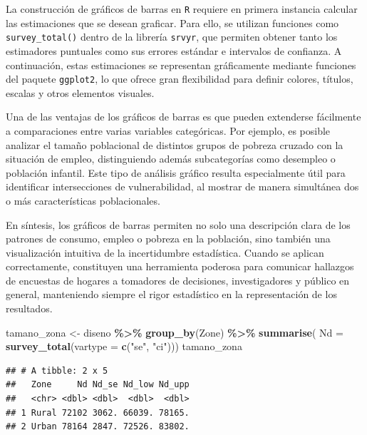 \documentclass[
  spanish,
  12pt,
]{book}
\newenvironment{Shaded}{\begin{snugshade}}{\end{snugshade}}
\newcommand{\AttributeTok}[1]{\textcolor[rgb]{0.13,0.29,0.53}{#1}}
\newcommand{\FunctionTok}[1]{\textcolor[rgb]{0.13,0.29,0.53}{\textbf{#1}}}
\newcommand{\NormalTok}[1]{#1}
\newcommand{\OtherTok}[1]{\textcolor[rgb]{0.56,0.35,0.01}{#1}}
\newcommand{\SpecialCharTok}[1]{\textcolor[rgb]{0.81,0.36,0.00}{\textbf{#1}}}
\newcommand{\StringTok}[1]{\textcolor[rgb]{0.31,0.60,0.02}{#1}}
\begin{document}
La construcción de gráficos de barras en \texttt{R} requiere en primera instancia calcular las estimaciones que se desean graficar. Para ello, se utilizan funciones como \texttt{survey\_total()} dentro de la librería \texttt{srvyr}, que permiten obtener tanto los estimadores puntuales como sus errores estándar e intervalos de confianza. A continuación, estas estimaciones se representan gráficamente mediante funciones del paquete \texttt{ggplot2}, lo que ofrece gran flexibilidad para definir colores, títulos, escalas y otros elementos visuales.

Una de las ventajas de los gráficos de barras es que pueden extenderse fácilmente a comparaciones entre varias variables categóricas. Por ejemplo, es posible analizar el tamaño poblacional de distintos grupos de pobreza cruzado con la situación de empleo, distinguiendo además subcategorías como desempleo o población infantil. Este tipo de análisis gráfico resulta especialmente útil para identificar intersecciones de vulnerabilidad, al mostrar de manera simultánea dos o más características poblacionales.

En síntesis, los gráficos de barras permiten no solo una descripción clara de los patrones de consumo, empleo o pobreza en la población, sino también una visualización intuitiva de la incertidumbre estadística. Cuando se aplican correctamente, constituyen una herramienta poderosa para comunicar hallazgos de encuestas de hogares a tomadores de decisiones, investigadores y público en general, manteniendo siempre el rigor estadístico en la representación de los resultados.

\begin{Shaded}
\begin{Highlighting}[]
\NormalTok{tamano\_zona }\OtherTok{\textless{}{-}}\NormalTok{ diseno }\SpecialCharTok{\%\textgreater{}\%}
  \FunctionTok{group\_by}\NormalTok{(Zone) }\SpecialCharTok{\%\textgreater{}\%}
  \FunctionTok{summarise}\NormalTok{( }\AttributeTok{Nd =} \FunctionTok{survey\_total}\NormalTok{(}\AttributeTok{vartype =} \FunctionTok{c}\NormalTok{(}\StringTok{"se"}\NormalTok{, }\StringTok{"ci"}\NormalTok{)))}
\NormalTok{tamano\_zona }
\end{Highlighting}
\end{Shaded}

\begin{verbatim}
## # A tibble: 2 x 5
##   Zone     Nd Nd_se Nd_low Nd_upp
##   <chr> <dbl> <dbl>  <dbl>  <dbl>
## 1 Rural 72102 3062. 66039. 78165.
## 2 Urban 78164 2847. 72526. 83802.
\end{verbatim}
\end{document}
